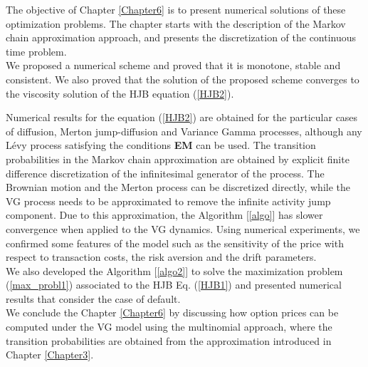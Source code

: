 The objective of Chapter \ref{Chapter6} is to present numerical solutions of these optimization problems. 
The chapter starts with the description of the Markov chain approximation approach, and presents the discretization of the continuous time problem.\\
We proposed a numerical scheme and proved that it is monotone, stable and consistent. 
We also proved that the solution of the proposed scheme converges to the viscosity solution of the
HJB equation (\ref{HJB2}).

Numerical results for the equation (\ref{HJB2}) are obtained for the particular cases of diffusion, Merton jump-diffusion and Variance Gamma processes, 
although any Lévy process satisfying the conditions \textbf{EM} can be used. 
The transition probabilities in the Markov chain approximation are obtained by explicit finite difference discretization of the 
infinitesimal generator of the process. 
The Brownian motion and the Merton process can be discretized directly, 
while the VG process needs to be approximated to remove the infinite activity jump component.
Due to this approximation, the Algorithm [\ref{algo}] has slower convergence when applied to the VG dynamics.
Using numerical experiments, we confirmed some features of the model such as the sensitivity of the price with respect to transaction costs, the risk aversion and the drift
parameters. \\
We also developed the Algorithm [\ref{algo2}] to solve the maximization problem (\ref{max_probl1}) associated to the HJB Eq. (\ref{HJB1})
and presented numerical results that consider the case of default. \\
We conclude the Chapter \ref{Chapter6} by discussing how option prices can be computed under the VG model using the multinomial approach, 
where the transition probabilities are obtained
from the approximation introduced in Chapter \ref{Chapter3}. 




